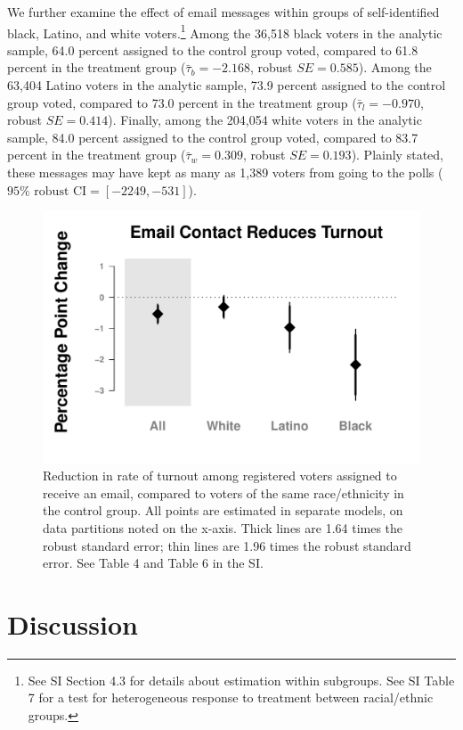 \documentclass[12pt]{article}
\begin{document}
We further examine the effect of email messages within groups of
self-identified black, Latino, and white voters.\footnote{See SI
  Section 4.3 for details about estimation within subgroups.  See SI
  Table 7 for a test for heterogeneous response to treatment between
  racial/ethnic groups.}  Among the 36,518 black voters in the
analytic sample, 64.0 percent assigned to the control group voted,
compared to 61.8 percent in the treatment group
($\bar{\tau}_{b} = -2.168$, robust $SE = 0.585$). Among the 63,404
Latino voters in the analytic sample, 73.9 percent assigned to the
control group voted, compared to 73.0 percent in the treatment group
($\bar{\tau}_{l} = -0.970$, robust $SE = 0.414$).  Finally, among the
204,054 white voters in the analytic sample, 84.0 percent assigned to
the control group voted, compared to 83.7 percent in the treatment
group ($\bar{\tau}_{w} = 0.309$, robust $SE = 0.193$). Plainly stated,
these messages may have kept as many as 1,389 voters from going to the
polls ($95\%\textrm{ robust CI} = [-2249, -531]$).

\begin{figure}[t]
  \centering
  \includegraphics[width=.75\textwidth]{../tables-figures/figure_1}
  \caption[Subgroup Effect Plot]{Reduction in rate of turnout among
    registered voters assigned to receive an email, compared to voters
    of the same race/ethnicity in the control group. All points are
    estimated in separate models, on data partitions noted on the
    x-axis. Thick lines are 1.64 times the robust standard error; thin
    lines are 1.96 times the robust standard error. See Table 4 and
    Table 6 in the SI. \label{fig:subgroup}}
\end{figure}
  

\section{Discussion}
\end{document}
